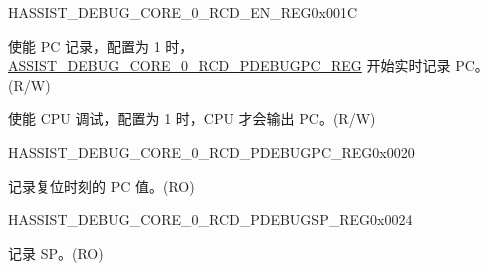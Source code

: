 \begin{register}{H}{ASSIST\_DEBUG\_CORE\_0\_RCD\_EN\_REG}{0x001C}\label{regdesc:ASSISTDEBUGCORE0RCDENREG}
%
%
%
\regnewline%
\begin{regdesc}\begin{reglist}
\label{fielddesc:ASSISTDEBUGCORE0RCDRECORDEN}\item [ASSIST\_DEBUG\_CORE\_0\_RCD\_RECORDEN] 使能 PC 记录，配置为 1 时，\hyperref[regdesc:ASSISTDEBUGCORE0RCDPDEBUGPCREG]{ASSIST\_DEBUG\_CORE\_0\_RCD\_PDEBUGPC\_REG} 开始实时记录 PC。(R/W)
\label{fielddesc:ASSISTDEBUGCORE0RCDPDEBUGEN}\item [ASSIST\_DEBUG\_CORE\_0\_RCD\_PDEBUGEN] 使能 CPU 调试，配置为 1 时，CPU 才会输出 PC。(R/W)
\end{reglist}\end{regdesc}
\end{register}


\begin{register}{H}{ASSIST\_DEBUG\_CORE\_0\_RCD\_PDEBUGPC\_REG}{0x0020}\label{regdesc:ASSISTDEBUGCORE0RCDPDEBUGPCREG}
%
\regnewline%
\begin{regdesc}\begin{reglist}
\label{fielddesc:ASSISTDEBUGCORE0RCDPDEBUGPC}\item [ASSIST\_DEBUG\_CORE\_0\_RCD\_PDEBUGPC] 记录复位时刻的 PC 值。(RO)
\end{reglist}\end{regdesc}
\end{register}


\begin{register}{H}{ASSIST\_DEBUG\_CORE\_0\_RCD\_PDEBUGSP\_REG}{0x0024}\label{regdesc:ASSISTDEBUGCORE0RCDPDEBUGSPREG}
%
\regnewline%
\begin{regdesc}\begin{reglist}
\label{fielddesc:ASSISTDEBUGCORE0RCDPDEBUGSP}\item [ASSIST\_DEBUG\_CORE\_0\_RCD\_PDEBUGSP] 记录 SP。(RO)
\end{reglist}\end{regdesc}
\end{register}


